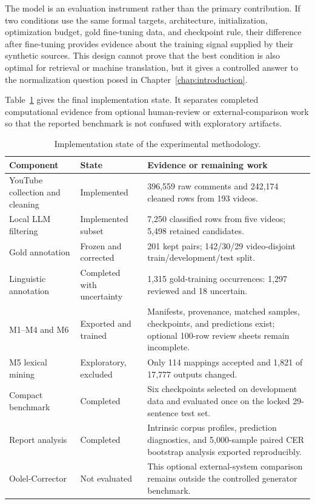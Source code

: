 \documentclass[12pt, a4paper, twoside, openany]{report}
\begin{document}
The model is an evaluation instrument rather than the primary contribution. If two conditions use the same formal targets, architecture, initialization, optimization budget, gold fine-tuning data, and checkpoint rule, their difference after fine-tuning provides evidence about the training signal supplied by their synthetic sources. This design cannot prove that the best condition is also optimal for retrieval or machine translation, but it gives a controlled answer to the normalization question posed in Chapter~\ref{chap:introduction}.

Table~\ref{tab:method-status} gives the final implementation state. It separates completed computational evidence from optional human-review or external-comparison work so that the reported benchmark is not confused with exploratory artifacts.

\begin{table}[H]
	\centering
	\caption{Implementation state of the experimental methodology.}
	\label{tab:method-status}
	\small
	\renewcommand{\arraystretch}{1.15}
	\begin{tabularx}{\textwidth}{>{\raggedright\arraybackslash}p{3.4cm}>{\raggedright\arraybackslash}p{3.0cm}X}
		\toprule
		\textbf{Component} & \textbf{State} & \textbf{Evidence or remaining work} \\
		\midrule
		YouTube collection and cleaning & Implemented & 396,559 raw comments and 242,174 cleaned rows from 193 videos. \\
		Local LLM filtering & Implemented subset & 7,250 classified rows from five videos; 5,498 retained candidates. \\
		Gold annotation & Frozen and corrected & 201 kept pairs; 142/30/29 video-disjoint train/development/test split. \\
		Linguistic annotation & Completed with uncertainty & 1,315 gold-training occurrences: 1,297 reviewed and 18 uncertain. \\
		M1--M4 and M6 & Exported and trained & Manifests, provenance, matched samples, checkpoints, and predictions exist; optional 100-row review sheets remain incomplete. \\
		M5 lexical mining & Exploratory, excluded & Only 114 mappings accepted and 1,821 of 17,777 outputs changed. \\
		Compact benchmark & Completed & Six checkpoints selected on development data and evaluated once on the locked 29-sentence test set. \\
		Report analysis & Completed & Intrinsic corpus profiles, prediction diagnostics, and 5,000-sample paired CER bootstrap analysis exported reproducibly. \\
		Oolel-Corrector & Not evaluated & This optional external-system comparison remains outside the controlled generator benchmark. \\
		\bottomrule
	\end{tabularx}
\end{table}
\end{document}
